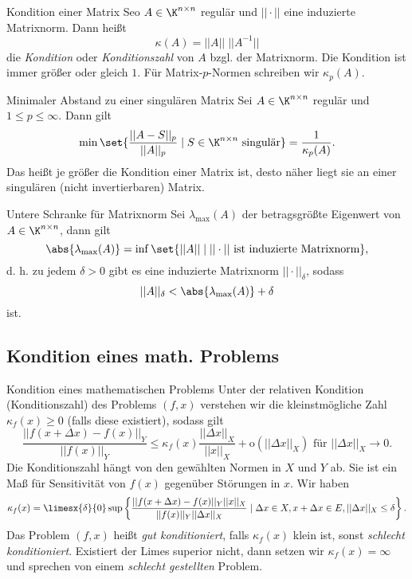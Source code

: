 \begin{karte}{Kondition einer Matrix}
    Seo \( A \in \K^{n\times n} \) regulär und \( ||\cdot|| \) eine induzierte 
    Matrixnorm. Dann heißt 
    \[ \kappa(A) = ||A|| \; ||A^{-1}|| \]
    die \textit{Kondition} oder \textit{Konditionszahl} von \(A\) bzgl. der Matrixnorm.
    Die Kondition ist immer größer oder gleich \(1\). Für Matrix-\(p\)-Normen schreiben wir 
    \( \kappa_p(A) \).
\end{karte}

\begin{karte}{Minimaler Abstand zu einer singulären Matrix}
    Sei \( A \in \K^{n\times n} \) regulär und \( 1 \leq p \leq \infty \). 
    Dann gilt 
    \[ \min \set{ \frac{||A-S||_p}{||A||_p} \; | \; S \in \K^{n\times n} \text{ singulär} } = \frac{1}{\kappa_p(A)}. \]
    Das heißt je größer die Kondition einer Matrix ist, desto näher liegt sie an einer singulären 
    (nicht invertierbaren) Matrix.
\end{karte}

\begin{karte}{Untere Schranke für Matrixnorm}
    Sei \( \lambda_{\max}(A) \) der betragsgrößte Eigenwert von \( A \in \K^{n\times n} \), 
    dann gilt 
    \[ \abs{ \lambda_{\max}(A)} = \inf \set{ ||A|| \;|\; ||\cdot|| \text{ ist induzierte Matrixnorm} }, \]
    d. h. zu jedem \(\delta > 0\) gibt es eine induzierte Matrixnorm \( ||\cdot||_\delta \), 
    sodass 
    \[ ||A||_\delta < \abs{\lambda_{\max}(A)} + \delta \]
    ist.
\end{karte}

\subsection*{Kondition eines math. Problems}

\begin{karte}{Kondition eines mathematischen Problems}
    Unter der relativen Kondition (Konditionszahl) des Problems 
    \( (f,x) \) verstehen wir die kleinstmögliche Zahl 
    \( \kappa_f(x) \geq 0 \) (falls diese existiert), sodass gilt 
    \[ \frac{ || f(x + \Delta x) - f(x) ||_Y }{ || f(x) ||_Y } \leq \kappa_f(x) \frac{ ||\Delta x||_X }{||x||_X} + \mathrm{o}(||\Delta x||_X) \text{ für } ||\Delta x||_X \rightarrow 0. \]
    Die Konditionszahl hängt von den gewählten Normen in \(X\) und \(Y\) ab. Sie ist ein Maß für 
    Sensitivität von \(f(x)\) gegenüber Störungen in \(x\). Wir haben 
    \[ \kappa_f(x) = \limesx{\delta}{0}\sup \left\{ \frac{ || f(x+\Delta x) - f(x) ||_Y ||x||_X }{ ||f(x)||_Y ||\Delta x||_X } \;|\; \Delta x \in X, x + \Delta x \in E, ||\Delta x ||_X\leq \delta \right\}. \]
    Das Problem \( (f,x) \) heißt \textit{gut konditioniert}, falls \( \kappa_f(x) \) klein ist, sonst \textit{schlecht konditioniert}.
    Existiert der Limes superior nicht, dann setzen wir \( \kappa_f(x) = \infty \) und sprechen von einem 
    \textit{schlecht gestellten} Problem.
\end{karte}

